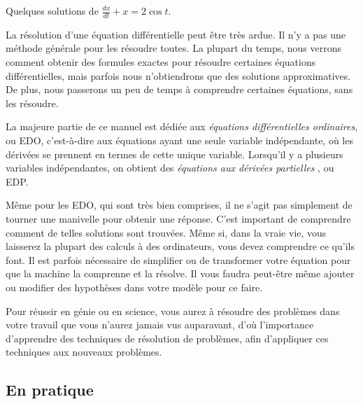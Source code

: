 \begin{mywrapfig}{3.25in}
\capstart
{}
\caption{Quelques solutions de $\frac{dx}{dt} + x = 2 \cos t$.\label{intro:plotsfig}}
\end{mywrapfig}%

La résolution d'une \'equation diff\'erentielle peut \^etre tr\`es ardue.  Il n'y a pas une m\'ethode g\'en\'erale pour les r\'esoudre toutes. La plupart du temps, nous verrons comment obtenir des formules exactes pour r\'esoudre certaines \'equations diff\'erentielles, mais parfois nous n'obtiendrons que des solutions approximatives. De plus, nous passerons un peu de temps \`a comprendre certaines \'equations, sans les r\'esoudre.

La majeure partie de ce manuel est d\'edi\'ee aux 
\emph{\'equations diff\'erentielles ordinaires},
ou EDO, c'est-\`a-dire aux \'equations ayant une seule variable ind\'ependante, o\`u les d\'eriv\'ees se prennent en termes de cette unique variable.  Lorsqu'il y a plusieurs variables ind\'ependantes, on obtient des 
\emph{\'equations aux d\'eriv\'ees partielles },
ou EDP.

M\^eme pour les EDO, qui sont tr\`es bien comprises, il ne s'agit pas simplement de tourner une manivelle pour obtenir une r\'eponse.  
  C'est important de comprendre comment de telles solutions sont trouv\'ees.  M\^eme si, dans la vraie vie, vous laisserez la plupart des calculs \`a des ordinateurs, vous devez comprendre ce qu'ils font.  Il est parfois n\'ecessaire de simplifier ou de transformer votre \'equation pour que la machine la comprenne et la r\'esolve.  Il vous faudra peut-\^etre m\^eme ajouter ou modifier des hypoth\`eses dans votre mod\`ele pour ce faire.
  
Pour r\'eussir en g\'enie ou en science, vous aurez \`a r\'esoudre des probl\`emes dans votre travail que vous n'aurez jamais vus auparavant, d'o\`u l'importance d'apprendre des techniques de r\'esolution de probl\`emes, afin d'appliquer ces techniques aux nouveaux probl\`emes.  
 
\subsection{En pratique}
\begin{myfig}
\end{myfig}

